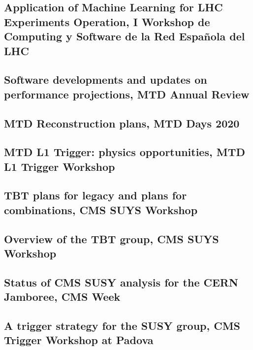 \documentclass[a4paper, 11pt, twoside, openright]{report}
\begin{document}
\subsection{Application of Machine Learning for LHC Experiments Operation, I Workshop de Computing y Software de la Red Española del LHC}


\subsection{Software developments and updates on performance projections, MTD Annual Review}


\subsection{MTD Reconstruction plans, MTD Days 2020}


\subsection{MTD L1 Trigger: physics opportunities, MTD L1 Trigger Workshop}


\subsection{TBT plans for legacy and plans for combinations, CMS SUYS Workshop}


\subsection{Overview of the TBT group, CMS SUYS Workshop}


\subsection{Status of CMS SUSY analysis for the CERN Jamboree, CMS Week}


\subsection{A trigger strategy for the SUSY group, CMS Trigger Workshop at Padova}

\end{document}

